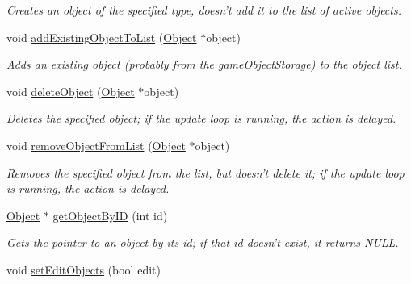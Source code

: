 \begin{DoxyCompactItemize}
\begin{DoxyCompactList}\small\item\em \-Creates an object of the specified type, doesn't add it to the list of active objects. \end{DoxyCompactList}\item 
\hypertarget{classObjectManager_a6dfe981ac2c57e2a1a48bc0b88bafaaf}{
void \hyperlink{classObjectManager_a6dfe981ac2c57e2a1a48bc0b88bafaaf}{add\-Existing\-Object\-To\-List} (\hyperlink{classObject}{\-Object} $\ast$object)}
\label{d6/d6f/classObjectManager_a6dfe981ac2c57e2a1a48bc0b88bafaaf}

\begin{DoxyCompactList}\small\item\em \-Adds an existing object (probably from the game\-Object\-Storage) to the object list. \end{DoxyCompactList}\item 
\hypertarget{classObjectManager_ae8a4bc8e9f47afb162191576c2b59e4d}{
void \hyperlink{classObjectManager_ae8a4bc8e9f47afb162191576c2b59e4d}{delete\-Object} (\hyperlink{classObject}{\-Object} $\ast$object)}
\label{d6/d6f/classObjectManager_ae8a4bc8e9f47afb162191576c2b59e4d}

\begin{DoxyCompactList}\small\item\em \-Deletes the specified object; if the update loop is running, the action is delayed. \end{DoxyCompactList}\item 
\hypertarget{classObjectManager_a1242095b8b729f06071cf65696cf998d}{
void \hyperlink{classObjectManager_a1242095b8b729f06071cf65696cf998d}{remove\-Object\-From\-List} (\hyperlink{classObject}{\-Object} $\ast$object)}
\label{d6/d6f/classObjectManager_a1242095b8b729f06071cf65696cf998d}

\begin{DoxyCompactList}\small\item\em \-Removes the specified object from the list, but doesn't delete it; if the update loop is running, the action is delayed. \end{DoxyCompactList}\item 
\hypertarget{classObjectManager_ac15552e1387aa93d47b03a7e2860021a}{
\hyperlink{classObject}{\-Object} $\ast$ \hyperlink{classObjectManager_ac15552e1387aa93d47b03a7e2860021a}{get\-Object\-By\-I\-D} (int id)}
\label{d6/d6f/classObjectManager_ac15552e1387aa93d47b03a7e2860021a}

\begin{DoxyCompactList}\small\item\em \-Gets the pointer to an object by its id; if that id doesn't exist, it returns \-N\-U\-L\-L. \end{DoxyCompactList}\item 
\hypertarget{classObjectManager_ae02d666157fcf6ae9115a38edc74215d}{
void \hyperlink{classObjectManager_ae02d666157fcf6ae9115a38edc74215d}{set\-Edit\-Objects} (bool edit)}
\label{d6/d6f/classObjectManager_ae02d666157fcf6ae9115a38edc74215d}


\end{DoxyCompactItemize}
